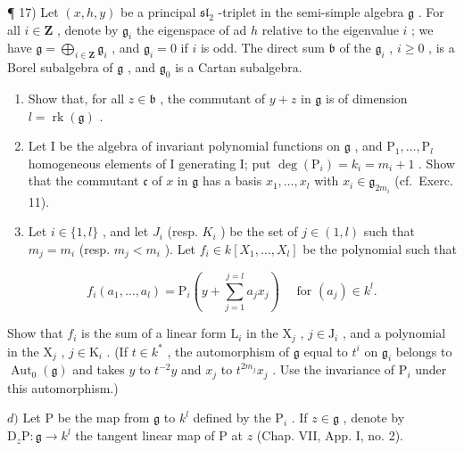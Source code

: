 ¶ 17) Let \((x, h, y)\) be a principal \(\mathfrak{sl}_2\) -triplet in the semi-simple algebra \(\mathfrak{g}\) . For all \(i \in \mathbf{Z}\) , denote by \(\mathfrak{g}_i\) the eigenspace of ad \(h\) relative to the eigenvalue \(i\) ; we have \(\mathfrak{g} = \bigoplus_{i \in \mathbf{Z}} \mathfrak{g}_i\) , and \(\mathfrak{g}_i = 0\) if \(i\) is odd. The direct sum \(\mathfrak{b}\) of the \(\mathfrak{g}_i\) , \(i \geq 0\) , is a Borel subalgebra of \(\mathfrak{g}\) , and \(\mathfrak{g}_0\) is a Cartan subalgebra.

\begin{enumerate}
\def\labelenumi{\alph{enumi})}
\item
  Show that, for all \(z \in \mathfrak{b}\) , the commutant of \(y + z\) in \(\mathfrak{g}\) is of dimension \(l = \operatorname{rk}(\mathfrak{g})\) .
\item
  Let I be the algebra of invariant polynomial functions on \(\mathfrak{g}\) , and \(\mathrm{P}_1, \ldots, \mathrm{P}_l\) homogeneous elements of I generating I; put \(\deg(\mathrm{P}_i) = k_i = m_i + 1\) . Show that the commutant \(\mathfrak{c}\) of \(x\) in \(\mathfrak{g}\) has a basis \(x_1, \ldots, x_l\) with \(x_i \in \mathfrak{g}_{2m_i}\) (cf.~Exerc. 11).
\item
  Let \(i \in \{1, l\}\) , and let \(J_i\) (resp. \(K_i\) ) be the set of \(j \in (1, l)\) such that \(m_j = m_i\) (resp. \(m_j < m_i\) ). Let \(f_i \in k[X_1, \ldots, X_l]\) be the polynomial such that
\end{enumerate}

\[
f _ {i} \left(a _ {1}, \dots , a _ {l}\right) = \mathrm{P} _ {i} \left(y + \sum_ {j = 1} ^ {j = l} a _ {j} x _ {j}\right) \quad \text { for } \left(a _ {j}\right) \in k ^ {l}.
\]

Show that \(f_{i}\) is the sum of a linear form \(\mathrm{L}_i\) in the \(\mathrm{X}_j\) , \(j \in \mathrm{J}_i\) , and a polynomial in the \(\mathrm{X}_j\) , \(j \in \mathrm{K}_i\) . (If \(t \in k^*\) , the automorphism of \(\mathfrak{g}\) equal to \(t^i\) on \(\mathfrak{g}_i\) belongs to \(\operatorname{Aut}_0(\mathfrak{g})\) and takes \(y\) to \(t^{-2}y\) and \(x_j\) to \(t^{2m_j}x_j\) . Use the invariance of \(\mathrm{P}_i\) under this automorphism.)

\(d)\) Let \(\mathrm{P}\) be the map from \(\mathfrak{g}\) to \(k^l\) defined by the \(\mathrm{P}_i\) . If \(z \in \mathfrak{g}\) , denote by \(\mathrm{D}_z\mathrm{P} : \mathfrak{g} \to k^l\) the tangent linear map of \(\mathrm{P}\) at \(z\) (Chap. VII, App. I, no. 2).

